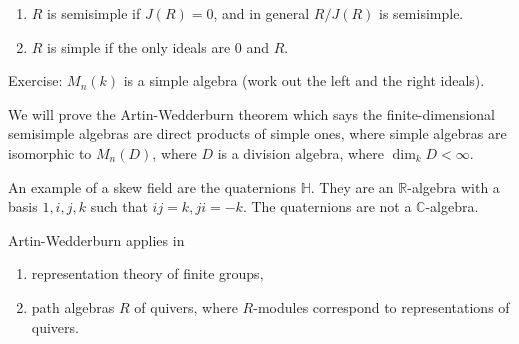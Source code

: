 \begin{enumerate}[label=(\alph*)]
	\item $R$ is semisimple if $J(R) = 0$, and in general $R/J(R)$ is semisimple.
	\item $R$ is simple if the only ideals are $0$ and $R$.
\end{enumerate}

Exercise: $M_n(k)$ is a simple algebra (work out the left and the right ideals).

We will prove the Artin-Wedderburn theorem which says the finite-dimensional
semisimple algebras are direct products of simple ones, where simple algebras
are isomorphic to $M_n(D)$, where $D$ is a division algebra, where $\dim_k D<\infty$.

An example of a skew field are the quaternions $\mathbb{H}$. They are an
$\mathbb{R}$-algebra with a basis $1, i, j, k$ such that $ij = k, ji = -k$.
The quaternions are not a $\mathbb{C}$-algebra.

Artin-Wedderburn applies in
\begin{enumerate}[label=(\alph*)]
	\item representation theory of finite groups,
	\item path algebras $R$ of quivers, where $R$-modules correspond to representations
		of quivers.
\end{enumerate}
